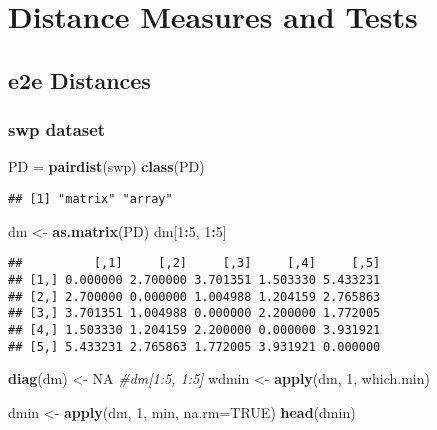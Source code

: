 \documentclass[
]{book}
\newenvironment{Shaded}{\begin{snugshade}}{\end{snugshade}}
\newcommand{\CommentTok}[1]{\textcolor[rgb]{0.56,0.35,0.01}{\textit{#1}}}
\newcommand{\DataTypeTok}[1]{\textcolor[rgb]{0.13,0.29,0.53}{#1}}
\newcommand{\DecValTok}[1]{\textcolor[rgb]{0.00,0.00,0.81}{#1}}
\newcommand{\KeywordTok}[1]{\textcolor[rgb]{0.13,0.29,0.53}{\textbf{#1}}}
\newcommand{\NormalTok}[1]{#1}
\newcommand{\OperatorTok}[1]{\textcolor[rgb]{0.81,0.36,0.00}{\textbf{#1}}}
\newcommand{\OtherTok}[1]{\textcolor[rgb]{0.56,0.35,0.01}{#1}}
\newcommand{\StringTok}[1]{\textcolor[rgb]{0.31,0.60,0.02}{#1}}
\begin{document}
\hypertarget{distance-measures-and-tests}{%
\section{Distance Measures and Tests}\label{distance-measures-and-tests}}

\hypertarget{e2e-distances}{%
\subsection{e2e Distances}\label{e2e-distances}}

\hypertarget{swp-dataset-1}{%
\subsubsection{swp dataset}\label{swp-dataset-1}}

\begin{Shaded}
\begin{Highlighting}[]
\NormalTok{PD =}\StringTok{ }\KeywordTok{pairdist}\NormalTok{(swp)}
\KeywordTok{class}\NormalTok{(PD)}
\end{Highlighting}
\end{Shaded}

\begin{verbatim}
## [1] "matrix" "array"
\end{verbatim}

\begin{Shaded}
\begin{Highlighting}[]
\NormalTok{dm <-}\StringTok{ }\KeywordTok{as.matrix}\NormalTok{(PD)}
\NormalTok{dm[}\DecValTok{1}\OperatorTok{:}\DecValTok{5}\NormalTok{, }\DecValTok{1}\OperatorTok{:}\DecValTok{5}\NormalTok{]}
\end{Highlighting}
\end{Shaded}

\begin{verbatim}
##          [,1]     [,2]     [,3]     [,4]     [,5]
## [1,] 0.000000 2.700000 3.701351 1.503330 5.433231
## [2,] 2.700000 0.000000 1.004988 1.204159 2.765863
## [3,] 3.701351 1.004988 0.000000 2.200000 1.772005
## [4,] 1.503330 1.204159 2.200000 0.000000 3.931921
## [5,] 5.433231 2.765863 1.772005 3.931921 0.000000
\end{verbatim}

\begin{Shaded}
\begin{Highlighting}[]
\KeywordTok{diag}\NormalTok{(dm) <-}\StringTok{ }\OtherTok{NA}
\CommentTok{#dm[1:5, 1:5]}
\NormalTok{wdmin <-}\StringTok{ }\KeywordTok{apply}\NormalTok{(dm, }\DecValTok{1}\NormalTok{, which.min)}

\NormalTok{dmin <-}\StringTok{ }\KeywordTok{apply}\NormalTok{(dm, }\DecValTok{1}\NormalTok{, min, }\DataTypeTok{na.rm=}\OtherTok{TRUE}\NormalTok{)}
\KeywordTok{head}\NormalTok{(dmin)}
\end{Highlighting}
\end{Shaded}
\end{document}
